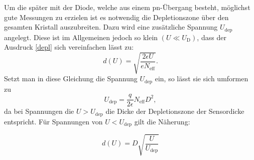 Um die später mit der Diode, welche aus einem pn-Übergang besteht, möglichst
gute Messungen zu erzielen ist es notwendig die Depletionszone über den gesamten
Kristall auszubreiten.  Dazu wird eine zusätzliche Spannung $U_\text{dep}$ angelegt.
Diese ist im Allgemeinen jedoch so klein $(U\ll U_\text{D})$, dass der Ausdruck \eqref{depl}
sich vereinfachen lässt zu:
\begin{equation}
    \label{dicke}
    d(U)=\sqrt{ \frac{ 2 \epsilon U }{e N_\text{eff}}}.
\end{equation}
Setzt man in diese Gleichung die Spannung $U_\text{dep}$ ein, so lässt sie sich umformen zu
\begin{equation}
    U_\text{dep}=\frac{q}{2 \epsilon} N_\text{eff}D^2,
\end{equation}
da bei Spannungen die $ U>U_\text{dep}$ die Dicke der Depletionszone der Sensordicke entspricht.
Für Spannungen von $U<U_\text{dep}$ gilt die Näherung:

\begin{equation}
    \label{depsu}
d(U)=D\sqrt{\frac{U}{U_\text{dep}}}
\end{equation}

